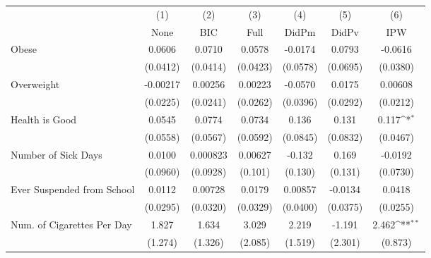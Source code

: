 {
\def\sym#1{\ifmmode^{#1}\else\(^{#1}\)\fi}
\begin{tabular}{l*{6}{c}}
\toprule
            &\multicolumn{1}{c}{(1)}&\multicolumn{1}{c}{(2)}&\multicolumn{1}{c}{(3)}&\multicolumn{1}{c}{(4)}&\multicolumn{1}{c}{(5)}&\multicolumn{1}{c}{(6)}\\
            &\multicolumn{1}{c}{None}&\multicolumn{1}{c}{BIC}&\multicolumn{1}{c}{Full}&\multicolumn{1}{c}{DidPm}&\multicolumn{1}{c}{DidPv}&\multicolumn{1}{c}{IPW}\\
\midrule
Obese       &      0.0606         &      0.0710         &      0.0578         &     -0.0174         &      0.0793         &     -0.0616         \\
            &    (0.0412)         &    (0.0414)         &    (0.0423)         &    (0.0578)         &    (0.0695)         &    (0.0380)         \\
\addlinespace
Overweight  &    -0.00217         &     0.00256         &     0.00223         &     -0.0570         &      0.0175         &     0.00608         \\
            &    (0.0225)         &    (0.0241)         &    (0.0262)         &    (0.0396)         &    (0.0292)         &    (0.0212)         \\
\addlinespace
Health is Good&      0.0545         &      0.0774         &      0.0734         &       0.136         &       0.131         &       0.117\sym{*}  \\
            &    (0.0558)         &    (0.0567)         &    (0.0592)         &    (0.0845)         &    (0.0832)         &    (0.0467)         \\
\addlinespace
Number of Sick Days&      0.0100         &    0.000823         &     0.00627         &      -0.132         &       0.169         &     -0.0192         \\
            &    (0.0960)         &    (0.0928)         &     (0.101)         &     (0.130)         &     (0.131)         &    (0.0730)         \\
\addlinespace
Ever Suspended from School&      0.0112         &     0.00728         &      0.0179         &     0.00857         &     -0.0134         &      0.0418         \\
            &    (0.0295)         &    (0.0320)         &    (0.0329)         &    (0.0400)         &    (0.0375)         &    (0.0255)         \\
\addlinespace
Num. of Cigarettes Per Day&       1.827         &       1.634         &       3.029         &       2.219         &      -1.191         &       2.462\sym{**} \\
            &     (1.274)         &     (1.326)         &     (2.085)         &     (1.519)         &     (2.301)         &     (0.873)         \\
\bottomrule
\end{tabular}
}
